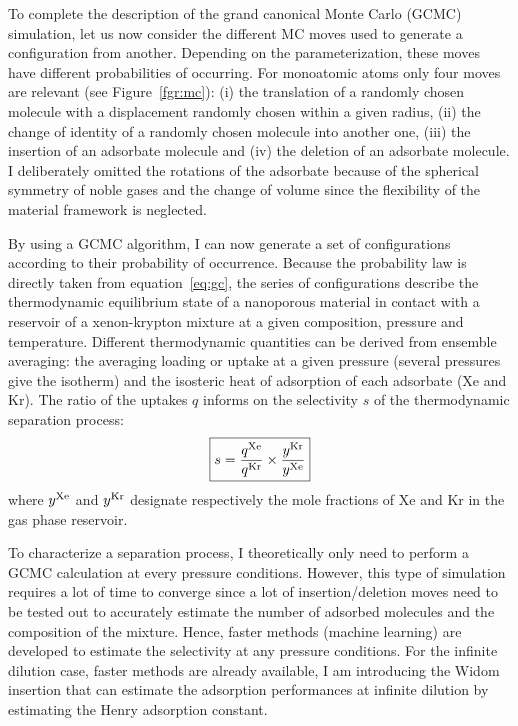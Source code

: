 \documentclass[main.tex]{subfiles}
\begin{document}
To complete the description of the grand canonical Monte Carlo (GCMC) simulation, let us now consider the different MC moves used to generate a configuration from another. Depending on the parameterization, these moves have different probabilities of occurring. For monoatomic atoms only four moves are relevant (see Figure~\ref{fgr:mc}): (i) the translation of a randomly chosen molecule with a displacement randomly chosen within a given radius, (ii) the change of identity of a randomly chosen molecule into another one, (iii) the insertion of an adsorbate molecule and (iv) the deletion of an adsorbate molecule. I deliberately omitted the rotations of the adsorbate because of the spherical symmetry of noble gases and the change of volume since the flexibility of the material framework is neglected. 

By using a GCMC algorithm, I can now generate a set of configurations according to their probability of occurrence. Because the probability law is directly taken from equation~\ref{eq:gc}, the series of configurations describe the thermodynamic equilibrium state of a nanoporous material in contact with a reservoir of a xenon-krypton mixture at a given composition, pressure and temperature. Different thermodynamic quantities can be derived from ensemble averaging: the averaging loading or uptake at a given pressure (several pressures give the isotherm) and the isosteric heat of adsorption of each adsorbate (Xe and Kr). The ratio of the uptakes $q$ informs on the selectivity $s$ of the thermodynamic separation process: 
\begin{equation}\label{eq:selec}
  \boxed{
  s = \dfrac{q^{\text{Xe}}}{q^{\text{Kr}}}\times\dfrac{y^{\text{Kr}}}{y^{\text{Xe}}}
  }
\end{equation}
where $y^{\text{Xe}}$ and $y^{\text{Kr}}$ designate respectively the mole fractions of Xe and Kr in the gas phase reservoir.

To characterize a separation process, I theoretically only need to perform a GCMC calculation at every pressure conditions. However, this type of simulation requires a lot of time to converge since a lot of insertion/deletion moves need to be tested out to accurately estimate the number of adsorbed molecules and the composition of the mixture. Hence, faster methods (machine learning) are developed to estimate the selectivity at any pressure conditions.\autocite{Simon_2015,Kang_2023} For the infinite dilution case, faster methods are already available, I am introducing the Widom insertion that can estimate the adsorption performances at infinite dilution by estimating the Henry adsorption constant.
\end{document}
